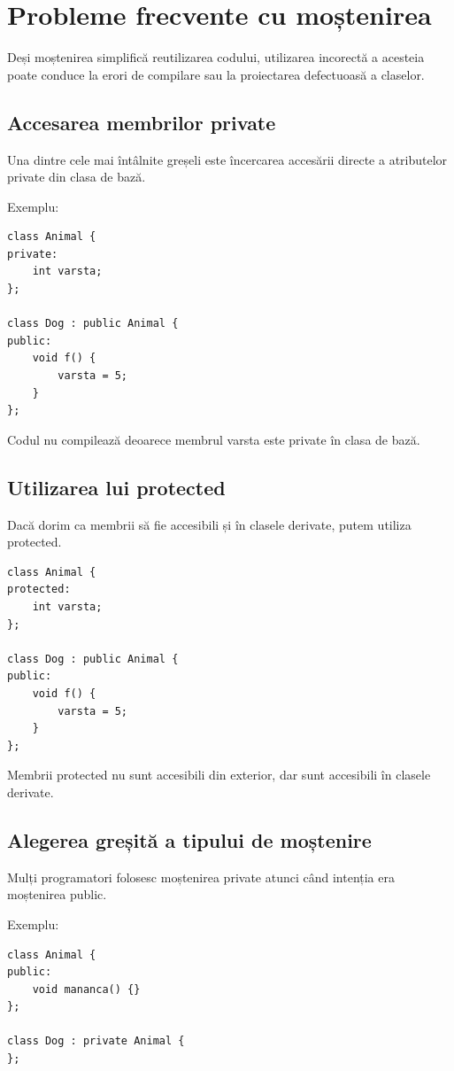 \documentclass[12pt,a4paper]{article}
\begin{document}
\section{Probleme frecvente cu moștenirea}

Deși moștenirea simplifică reutilizarea codului, utilizarea incorectă a acesteia poate conduce la erori de compilare sau la proiectarea defectuoasă a claselor.

\subsection{Accesarea membrilor private}

Una dintre cele mai întâlnite greșeli este încercarea accesării directe a atributelor private din clasa de bază.

Exemplu:

\begin{verbatim}
class Animal {
private:
    int varsta;
};

class Dog : public Animal {
public:
    void f() {
        varsta = 5;
    }
};
\end{verbatim}

Codul nu compilează deoarece membrul varsta este private în clasa de bază.

\subsection{Utilizarea lui protected}

Dacă dorim ca membrii să fie accesibili și în clasele derivate, putem utiliza protected.

\begin{verbatim}
class Animal {
protected:
    int varsta;
};

class Dog : public Animal {
public:
    void f() {
        varsta = 5;
    }
};
\end{verbatim}

Membrii protected nu sunt accesibili din exterior, dar sunt accesibili în clasele derivate.

\subsection{Alegerea greșită a tipului de moștenire}

Mulți programatori folosesc moștenirea private atunci când intenția era moștenirea public.

Exemplu:

\begin{verbatim}
class Animal {
public:
    void mananca() {}
};

class Dog : private Animal {
};
\end{verbatim}
\end{document}
